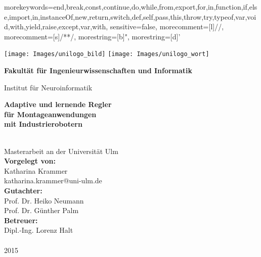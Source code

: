 \documentclass[a4paper,12pt,twoside,openright,DIV=9
]{scrbook}
\makeatletter
\newcommand{\fullname}{Katharina Krammer}
\newcommand{\email}{katharina.krammer@uni-ulm.de}
\newcommand{\titel}{Adaptive und lernende Regler \\ für Montageanwendungen \\ mit Industrierobotern}
\newcommand{\jahr}{2015}
\newcommand{\gutachterA}{Prof. Dr. Heiko Neumann}
\newcommand{\gutachterB}{Prof. Dr. Günther Palm}
\newcommand{\betreuer}{Dipl.-Ing. Lorenz Halt}
\newcommand{\fakultaet}{Ingenieurwissenschaften und Informatik}
\newcommand{\institut}{Institut für Neuroinformatik}
\makeatother
\begin{document}


 {	
	morekeywords={end,break,const,continue,do,while,from,export,for,in,function,if,else,import,in,instanceOf,new,return,switch,def,self,pass,this,throw,try,typeof,var,void,with,yield,raise,except,var,with},
sensitive=false,
morecomment=[l]{//},
morecomment=[s]{/*}{*/},
morestring=[b]",
morestring=[d]'
}


	


\thispagestyle{empty}
\begin{addmargin*}[4mm]{-0mm}

\texttt{[image: Images/unilogo\_bild]}
\hfill
\texttt{[image: Images/unilogo\_wort]}\\[1em]

{\footnotesize

\hfill{}\bfseries Fakultät für \fakultaet

\hfill{}\mdseries \institut\\[2cm]
\parbox{200mm}{\bfseries \huge \titel}\\[0.5em]
{\footnotesize Masterarbeit an der Universität Ulm}\\[3em]
{\footnotesize \bfseries Vorgelegt von:}\\
{\footnotesize \fullname\\\email}\\[2em]
{\footnotesize \bfseries Gutachter:}\\                     
{\footnotesize\gutachterA\\
\gutachterB
}\\[2em]
{\footnotesize \bfseries Betreuer:}\\ 
{\footnotesize\betreuer}\\\\
{\footnotesize\jahr}
}
\end{addmargin*}
\end{document}
